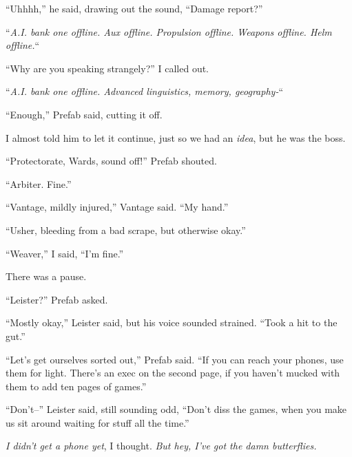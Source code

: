``Uhhhh,'' he said, drawing out the sound, ``Damage report?''



``\emph{A.I. bank one offline.  Aux offline.  Propulsion offline.  Weapons offline.  Helm offline.}``



``Why are you speaking strangely?''  I called out.



``\emph{A.I. bank one offline.  Advanced linguistics, memory, geography-}``



``Enough,'' Prefab said, cutting it off.



I almost told him to let it continue, just so we had an \emph{idea}, but he was the boss.



``Protectorate, Wards, sound off!''  Prefab shouted.



``Arbiter.  Fine.''



``Vantage, mildly injured,'' Vantage said.  ``My hand.''



``Usher, bleeding from a bad scrape, but otherwise okay.''



``Weaver,'' I said, ``I'm fine.''



There was a pause.



``Leister?''  Prefab asked.



``Mostly okay,'' Leister said, but his voice sounded strained.  ``Took a hit to the gut.''



``Let's get ourselves sorted out,'' Prefab said.  ``If you can reach your phones, use them for light.  There's an exec on the second page, if you haven't mucked with them to add ten pages of games.''



``Don't--'' Leister said, still sounding odd, ``Don't diss the games, when you make us sit around waiting for stuff all the time.''



\emph{I didn't get a phone yet}, I thought.  \emph{But hey, I've got the damn butterflies.}



